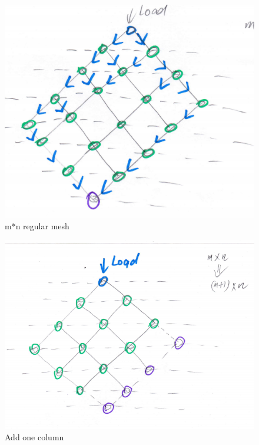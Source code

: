 \documentclass[preprint,12pt]{elsarticle}
\begin{document}
\begin{figure}[h]
\centering\includegraphics[width=1\linewidth]{unitmesh4}
\caption{m*n regular mesh}
\label{unitmesh4}
\end{figure}



\begin{figure}[h]
\centering\includegraphics[width=1\linewidth]{unitmesh5}
\caption{Add one column }
\label{unitmesh5}
\end{figure}
\end{document}
